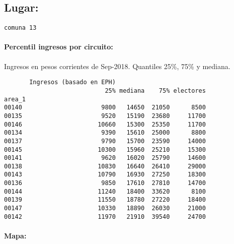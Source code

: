 \documentclass[11pt]{article}
\begin{document}
    
    \hypertarget{lugar}{%
\subsection{Lugar:}\label{lugar}}

    
    \begin{Verbatim}[commandchars=\\\{\}]
comuna 13

    \end{Verbatim}

    \hypertarget{percentil-ingresos-por-circuito}{%
\paragraph{Percentil ingresos por
circuito:}\label{percentil-ingresos-por-circuito}}

    
    Ingresos en pesos corrientes de Sep-2018. Quantiles 25\%, 75\% y
mediana.

    
    
    \begin{verbatim}
       Ingresos (basado en EPH)                         
                            25% mediana    75% electores
area_1                                                  
00140                      9800   14650  21050      8500
00135                      9520   15190  23680     11700
00146                     10660   15300  25350     11700
00134                      9390   15610  25000      8800
00137                      9790   15700  23590     14000
00145                     10300   15960  25210     15300
00141                      9620   16020  25790     14600
00138                     10830   16640  26410     29000
00143                     10790   16930  27250     18300
00136                      9850   17610  27810     14700
00144                     11240   18400  33620      8100
00139                     11550   18780  27220     18400
00147                     10330   18890  26030     21000
00142                     11970   21910  39540     24700
    \end{verbatim}

    
    \hypertarget{mapa}{%
\paragraph{Mapa:}\label{mapa}}

    
    \begin{center}
    \end{center}
    { \hspace*{\fill} \\}
    
\end{document}
